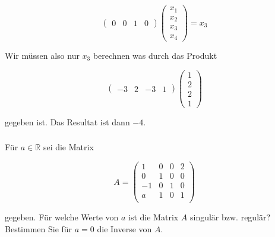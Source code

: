 \begin{solution}
    \vspace{1\baselineskip}

    \begin{equation*}
        \begin{pmatrix}
        0 & 0 & 1 & 0
        \end{pmatrix}
        \begin{pmatrix}
            x_1 \\
            x_2 \\
            x_3 \\
            x_4 
        \end{pmatrix}
        = x_3
    \end{equation*}

    Wir müssen also nur \( x_3 \) berechnen was durch das Produkt 
    
    \begin{equation*}
        \begin{pmatrix} -3 & 2 & -3 & 1 \end{pmatrix} \begin{pmatrix} 1 \\ 2 \\ 2 \\ 1 \end{pmatrix} 
    \end{equation*}

    gegeben ist. Das Resultat ist dann \( -4 \).  

\end{solution}

\newpage

\subsubsection{} %
Für \( a \in \mathbb{R} \)  sei die Matrix

\begin{equation*}
    A = \begin{pmatrix}
    1 & 0 & 0 & 2 \\
    0 & 1 & 0 & 0 \\
    -1 & 0 & 1 & 0 \\
    a & 1 & 0 & 1 \\
    \end{pmatrix}
\end{equation*}

gegeben. Für welche Werte von \( a \) ist die Matrix \( A \) singulär bzw. regulär? Bestimmen Sie für \( a = 0 \) die Inverse von \( A \). 

